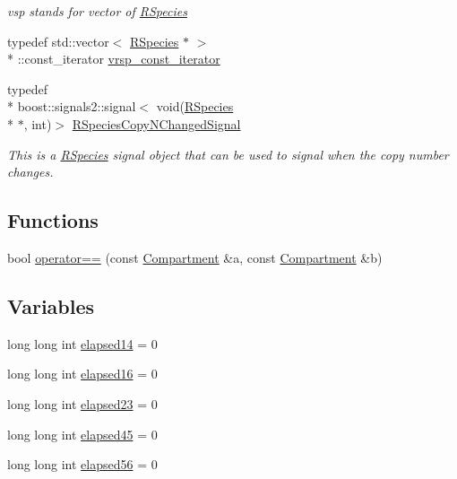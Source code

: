 \begin{DoxyCompactItemize}
\begin{DoxyCompactList}\small\item\em vsp stands for vector of \hyperlink{classchem_1_1RSpecies}{R\-Species} \end{DoxyCompactList}\item 
typedef std\-::vector$<$ \hyperlink{classchem_1_1RSpecies}{R\-Species} $\ast$ $>$\\*
\-::const\-\_\-iterator \hyperlink{namespacechem_ab6ba36c9953625b15ff4105e1cdfdb86}{vrsp\-\_\-const\-\_\-iterator}
\item 
typedef \\*
boost\-::signals2\-::signal$<$ void(\hyperlink{classchem_1_1RSpecies}{R\-Species} \\*
$\ast$, int)$>$ \hyperlink{namespacechem_a6cb4144586460e7b7ae0dffdf08eb57c}{R\-Species\-Copy\-N\-Changed\-Signal}
\begin{DoxyCompactList}\small\item\em This is a \hyperlink{classchem_1_1RSpecies}{R\-Species} signal object that can be used to signal when the copy number changes. \end{DoxyCompactList}\end{DoxyCompactItemize}
\subsection*{Functions}
\begin{DoxyCompactItemize}
\item 
bool \hyperlink{namespacechem_a9342b2280a45cc2043074e2a618be723}{operator==} (const \hyperlink{classchem_1_1Compartment}{Compartment} \&a, const \hyperlink{classchem_1_1Compartment}{Compartment} \&b)
\end{DoxyCompactItemize}
\subsection*{Variables}
\begin{DoxyCompactItemize}
\item 
long long int \hyperlink{namespacechem_ac389831014b55592c5e49626f448b287}{elapsed14} = 0
\item 
long long int \hyperlink{namespacechem_a62660120694a02fc2e5d6f8aef254a00}{elapsed16} = 0
\item 
long long int \hyperlink{namespacechem_a0197cd49bd8ebf45cab3710c9022c08d}{elapsed23} = 0
\item 
long long int \hyperlink{namespacechem_ac3fe333a7580df824dc4f7e827a05528}{elapsed45} = 0
\item 
long long int \hyperlink{namespacechem_a06af82e2b66ef7327fc568000f4a7279}{elapsed56} = 0
\end{DoxyCompactItemize}


